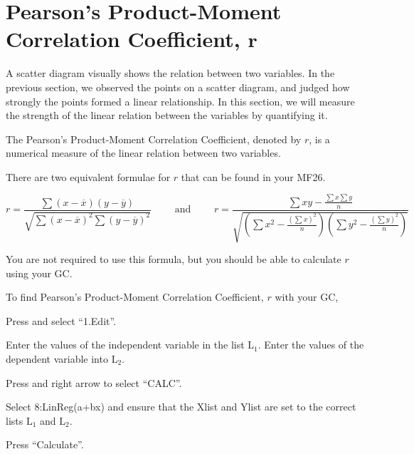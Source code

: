 \documentclass[11pt,a4paper]{book}
\begin{document}
\newpage

\section{Pearson's Product-Moment Correlation Coefficient, $\boldsymbol{r}$}

A scatter diagram visually shows the relation between two variables.
In the previous section, we observed the points on a scatter diagram,
and judged how strongly the points formed a linear relationship. In
this section, we will measure the strength of the linear relation between
the variables by quantifying it.

The Pearson's Product-Moment Correlation Coefficient, denoted by $r$,
is a numerical measure of the linear relation between two variables.

There are two equivalent formulae for $r$ that can be found in your
MF26.

\[
r=\frac{\sum\left(x-\overline{x}\right)\left(y-\overline{y}\right)}{\sqrt{\sum\left(x-\overline{x}\right)^{2}\sum\left(y-\overline{y}\right)^{2}}}\qquad\text{ and }\qquad r=\frac{\sum xy-\frac{\sum x\sum y}{n}}{\sqrt{\left(\sum x^{2}-\frac{\left(\sum x\right)^{2}}{n}\right)\left(\sum y^{2}-\frac{\left(\sum y\right)^{2}}{n}\right)}}
\]

You are not required to use this formula, but you should be able to
calculate $r$ using your GC.

To find Pearson's Product-Moment Correlation Coefficient, $r$ with
your GC,

\begin{steps}[leftmargin=1.5cm]

\item  Press \tcbox[box align=base,nobeforeafter,colback=black, colframe=black,size=small]{\textbf{\textcolor{white}{stat}}}
and select ``1.Edit''.

\item  Enter the values of the independent variable in the list $\text{L}_{1}$.
Enter the values of the dependent variable into $\text{L}_{2}$.

\item  Press \tcbox[box align=base,nobeforeafter,colback=black, colframe=black,size=small]{\textbf{\textcolor{white}{stat}}}
and right arrow to select ``CALC''.

\item  Select 8:LinReg(a+bx) and ensure that the Xlist and Ylist
are set to the correct lists $\text{L}_{1}$ and $\text{L}_{2}$.

\item Press ``Calculate''.

\end{steps}
\end{document}
